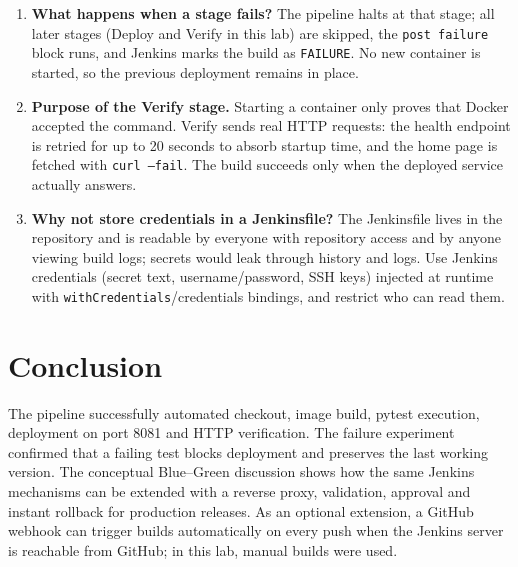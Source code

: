 \documentclass[11pt,a4paper]{article}
\begin{document}
\begin{enumerate}[label=\arabic*.]
  at the failed stage, a broken version is never deployed and users keep seeing the
  last working release.
\item \textbf{What happens when a stage fails?} The pipeline halts at that stage; all
  later stages (Deploy and Verify in this lab) are skipped, the \texttt{post failure}
  block runs, and Jenkins marks the build as \texttt{FAILURE}. No new container is
  started, so the previous deployment remains in place.
\item \textbf{Purpose of the Verify stage.} Starting a container only proves that Docker
  accepted the command. Verify sends real HTTP requests: the health endpoint is retried
  for up to 20 seconds to absorb startup time, and the home page is fetched with
  \texttt{curl --fail}. The build succeeds only when the deployed service actually
  answers.
\item \textbf{Why not store credentials in a Jenkinsfile?} The Jenkinsfile lives in the
  repository and is readable by everyone with repository access and by anyone viewing
  build logs; secrets would leak through history and logs. Use Jenkins credentials
  (secret text, username/password, SSH keys) injected at runtime with
  \texttt{withCredentials}/credentials bindings, and restrict who can read them.
\end{enumerate}

\section{Conclusion}

The pipeline successfully automated checkout, image build, pytest execution,
deployment on port 8081 and HTTP verification. The failure experiment confirmed that a
failing test blocks deployment and preserves the last working version. The conceptual
Blue--Green discussion shows how the same Jenkins mechanisms can be extended with a
reverse proxy, validation, approval and instant rollback for production releases. As an
optional extension, a GitHub webhook can trigger builds automatically on every push
when the Jenkins server is reachable from GitHub; in this lab, manual builds were used.
\end{document}
